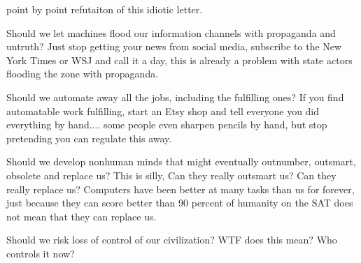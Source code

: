 point by point refutaiton of this idiotic letter. \cite{dumbestletter}

Should we let machines flood our information channels with propaganda and untruth? Just stop getting your news from social media, subscribe to the New York Times or WSJ and call it a day, this is already a problem with state actors flooding the zone with propaganda.

Should we automate away all the jobs, including the fulfilling ones? If you find automatable work fulfilling, start an Etsy shop and tell everyone you did everything by hand.... some people even sharpen pencils by hand, but stop pretending you can regulate this away. 

Should we develop nonhuman minds that might eventually outnumber, outsmart, obsolete and replace us? This is silly, Can they really outsmart us? Can they really replace us? Computers have been better at many tasks than us for forever, just because they can score better than 90 percent of humanity on the SAT does not mean that they can replace us. 

Should we risk loss of control of our civilization? WTF does this mean? Who controls it now?


